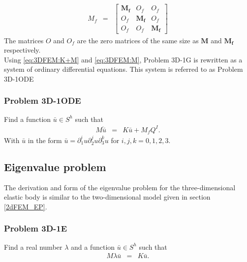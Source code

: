 \documentclass[../../main.tex]{subfiles}
\begin{document}
\begin{eqnarray}
	M_f & = &
	\begin{bmatrix}
		\mathbf{M_f} & {O_f} & {O_f}\\
		{O_f} & \mathbf{M_f} & {O_f}\\
		{O_f} & {O_f} & \mathbf{M_f}
	\end{bmatrix}\label{eq:3DFEM:M}
\end{eqnarray}
The matrices ${O}$ and ${O_f}$ are the zero matrices of the same size as $\mathbf{M}$ and $\mathbf{M_f}$ respectively.\\

Using \eqref{eq:3DFEM:K+M} and \eqref{eq:3DFEM:M}, Problem 3D-1G is rewritten as a system of ordinary differential equations. This system is referred to as Problem 3D-1ODE

\subsubsection{Problem 3D-1ODE}
Find a function $\bar{u} \in S^h$ such that
\begin{eqnarray}
	M\ddot{\bar{u}} & = & K\bar{u} + M_{f}Q^I. \label{3D_M}
\end{eqnarray} With $\bar{u}$ in the form $\bar{u} = \partial^i_1u \partial^j_2u \partial^k_3u$ for $i,j,k = 0,1,2,3$.

\subsection{Eigenvalue problem}
The derivation and form of the eigenvalue problem for the three-dimensional elastic body is similar to the two-dimensional model given in section \ref{2dFEM_EP}.

\subsubsection{Problem 3D-1E}\label{3dFEM_EP}
Find a real number $\lambda$ and a function $\bar{u} \in S^h$ such that
\begin{eqnarray}
	M\lambda{\bar{u}} & = & K\bar{u}.
\end{eqnarray}
\end{document}
